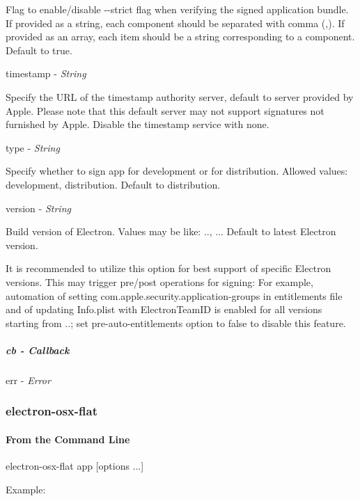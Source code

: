 Flag to enable/disable {\ttfamily -\/-\/strict} flag when verifying the signed application bundle. If provided as a string, each component should be separated with comma ({\ttfamily ,}). If provided as an array, each item should be a string corresponding to a component. Default to {\ttfamily true}.

{\ttfamily timestamp} -\/ {\itshape String}

Specify the U\+RL of the timestamp authority server, default to server provided by Apple. Please note that this default server may not support signatures not furnished by Apple. Disable the timestamp service with {\ttfamily none}.

{\ttfamily type} -\/ {\itshape String}

Specify whether to sign app for development or for distribution. Allowed values\+: {\ttfamily development}, {\ttfamily distribution}. Default to {\ttfamily distribution}.

{\ttfamily version} -\/ {\itshape String}

Build version of Electron. Values may be like\+: {..}, {..}. Default to latest Electron version.

It is recommended to utilize this option for best support of specific Electron versions. This may trigger pre/post operations for signing\+: For example, automation of setting {\ttfamily com.\+apple.\+security.\+application-\/groups} in entitlements file and of updating {\ttfamily Info.\+plist} with {\ttfamily Electron\+Team\+ID} is enabled for all versions starting from {..}; set {\ttfamily pre-\/auto-\/entitlements} option to {\ttfamily false} to disable this feature.

\subparagraph*{cb -\/ Callback}

{\ttfamily err} -\/ {\itshape Error}

\subsubsection*{electron-\/osx-\/flat}

\paragraph*{From the Command Line}


\begin{DoxyCode}
electron-osx-flat app [options ...]
\end{DoxyCode}


Example\+:


